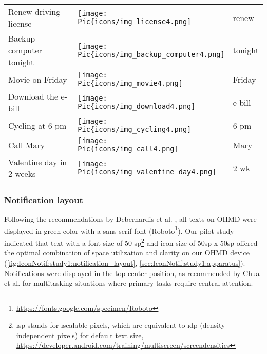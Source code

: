 \begin{table}[hptb]
\begin{tabular}{@{}p{5.5cm}p{1cm}p{1.8cm}@{}}
    Renew driving license                 &   \texttt{[image: \\Pic\{icons/img\_license4.png]}}       & \hspace{1mm} renew          \\  

    Backup computer tonight                 &   \texttt{[image: \\Pic\{icons/img\_backup\_computer4.png]}}       & \hspace{1mm} tonight          \\  

    Movie on Friday                 &   \texttt{[image: \\Pic\{icons/img\_movie4.png]}}       & \hspace{1mm} Friday          \\  

    Download the e-bill                 &   \texttt{[image: \\Pic\{icons/img\_download4.png]}}       & \hspace{1mm} e-bill          \\  
    
    Cycling at 6 pm                 &   \texttt{[image: \\Pic\{icons/img\_cycling4.png]}}       & \hspace{1mm} 6 pm          \\  

    Call Mary                  &   \texttt{[image: \\Pic\{icons/img\_call4.png]}}       & \hspace{1mm} Mary          \\   

    Valentine day in 2 weeks                 &   \texttt{[image: \\Pic\{icons/img\_valentine\_day4.png]}}       & \hspace{1mm} 2 wk          \\  
    \bottomrule
    \end{tabular}
\end{table}





\subsubsection*{Notification layout}

Following the recommendations by Debernardis et al. \cite{debernardis_text_2014}, all texts on OHMD were displayed in green color with a sans-serif font (Roboto\footnote{\url{https://fonts.google.com/specimen/Roboto}}). Our pilot study indicated that text with a font size of 50 sp\footnote{\i{sp} stands for \i{scalable pixels}, which are equivalent to \i{dp (density-independent pixels)} for default text size, \url{https://developer.android.com/training/multiscreen/screendensities}} and icon size of 50sp x 50sp offered the optimal combination of space utilization and clarity on our OHMD device (\autoref{fig:IconNotif:study1:notification_layout}, \autoref{sec:IconNotif:study1:apparatus}).
Notifications were displayed in the top-center position, as recommended by Chua et al. \cite{chua_positioning_2016} for multitasking situations where primary tasks require central attention.


